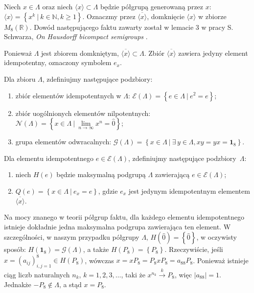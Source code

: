 {Niech $x \in \Lambda$ oraz niech
$\langle x \rangle \subset \Lambda$ będzie półgrupą generowaną przez $x$:
$\langle x \rangle = \left \{ x^{k} \: | \: k \in \mathbb{N}, k \geq 1 \right \}$.
Oznaczmy przez $\overline{\langle x \rangle}$,
domknięcie $\langle x \rangle$ w zbiorze $M_{8}(\mathbb{R})$.
Dowód następującego faktu zawarty został w lemacie 3 w
pracy S.\,Schwarza, \emph{On Hausdorff bicompact semigroups}
\cite{schwarz1955hausdorff}.

\begin{Theorem}
    \label{prop:UniqeClusterPoint}
    Ponieważ $\Lambda$ jest zbiorem domkniętym, $\overline{\langle x \rangle} \subset \Lambda$.
    Zbiór $\overline{\langle x \rangle}$ zawiera jedyny element idempotentny,
    oznaczony symbolem $e_{x}$.
\end{Theorem}

\begin{Definition}
    Dla zbioru $\Lambda$, zdefiniujmy następujące podzbiory:
    \begin{enumerate}
       \item zbiór elementów idempotentnych w $\Lambda$:
            $\mathcal{E}(\Lambda) = \left \{ e \in \Lambda \: |  \: e^{2} = e \right \}$;
       \item zbiór uogólnionych elementów nilpotentnych:\\
            $\mathcal{N}(\Lambda) = \left \{ x \in \Lambda \: |  \: \lim \limits_{n \rightarrow \infty} x^{n} = \hat{0} \right \}$;
       \item grupa elementów odwracalnych:
            $\mathcal{G}(\Lambda) = \left \{ x \in \Lambda \: |  \: \exists \, y \in \Lambda, xy = yx = \mathbf{1}_{8} \right \}$.
    \end{enumerate}
   Dla elementu idempotentnego $e \in \mathcal{E}(\Lambda)$,
   zdefiniujmy następujące \mbox{podzbiory $\Lambda$}:
   \begin{enumerate}
        \item niech $H(e)$ będzie maksymalną podgrupą $\Lambda$
            zawierającą $e \in \mathcal{E}(\Lambda)$;
        \item $Q(e) = \left \{ x \in \Lambda \: | \: e_{x} = e \right \}$,
        gdzie $e_{x}$ jest jedynym idempotentnym elementem
        $\overline{\langle x \rangle}$.
   \end{enumerate}
\end{Definition}

\begin{Remark}
\label{rem:GOfLambda}
Na mocy znanego w teorii półgrup faktu, dla każdego elementu idempotentnego
istnieje dokładnie jedna maksymalna podgrupa zawierająca ten element.
W szczególności, w naszym przypadku półgrupy $\Lambda$,
$H(\hat{0}) = \left \{ \hat{0} \right \}$,
w oczywisty sposób:
$H(\mathbf{1}_{8}) = \mathcal{G}(\Lambda)$,
a także $H(P_{8}) = \left \{ P_{8} \right \}$.
Rzeczywiście,
jeśli $x = (a_{ij})_{i,j=1}^{8} \in H(P_{8})$,
wówczas
$x = x P_{8} = P_{8} x P_{8} = a_{88} P_{8}$.
Ponieważ istnieje ciąg liczb naturalnych  $n_{k}$, $k=1,2,3,\ldots$,
taki że $x^{n_{k}} \overset{k}{\rightarrow} P_{8}$,
więc
$|a_{88}| = 1$. Jednakże $- P_{8} \notin \Lambda$,
a stąd $x = P_{8}$.
\end{Remark}

}
